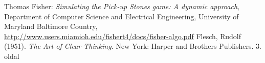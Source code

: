 \begin{thebibliography}{x}
 Thomas Fisher: {\em Simulating the Pick-up Stones game: A dynamic approach}, Department of Computer Science and Electrical Engineering,
University of Maryland Baltimore Country, {\ttfamily \url{ http://www.users.miamioh.edu/fishert4/docs/fisher-algo.pdf}}
Flesch, Rudolf (1951). {\em The Art of Clear Thinking.} New York: Harper and Brothers Publishers. 3. oldal
\end{thebibliography}
